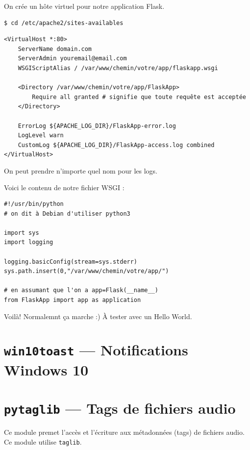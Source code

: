 \documentclass[a4paper, 10pt]{article}
\begin{document}
On crée un hôte virtuel pour notre application Flask.

\begin{verbatim}
$ cd /etc/apache2/sites-availables
\end{verbatim}

\begin{verbatim}
<VirtualHost *:80>
    ServerName domain.com
    ServerAdmin youremail@email.com
    WSGIScriptAlias / /var/www/chemin/votre/app/flaskapp.wsgi

    <Directory /var/www/chemin/votre/app/FlaskApp>
        Require all granted # signifie que toute requête est acceptée
    </Directory>

    ErrorLog ${APACHE_LOG_DIR}/FlaskApp-error.log
    LogLevel warn
    CustomLog ${APACHE_LOG_DIR}/FlaskApp-access.log combined
</VirtualHost>
\end{verbatim}

On peut prendre n'importe quel nom pour les logs.

Voici le contenu de notre fichier WSGI :

\begin{verbatim}
#!/usr/bin/python
# on dit à Debian d'utiliser python3

import sys
import logging

logging.basicConfig(stream=sys.stderr)
sys.path.insert(0,"/var/www/chemin/votre/app/")

# en assumant que l'on a app=Flask(__name__)
from FlaskApp import app as application
\end{verbatim}

Voilà! Normalemnt ça marche :) À tester avec un Hello World.

\section[{\footnotesize\texttt{win10toast}} --- Notifications sous Windows 10]{{\normalfont\large\bfseries\texttt{win10toast}} --- Notifications Windows 10}


\section[{\footnotesize\texttt{pytaglib}} --- Tags de fichiers audio]{{\normalfont\large\bfseries\texttt{pytaglib}} --- Tags de fichiers audio}
Ce module premet l'accès et l'écriture aux métadonnées (tags) de fichiers audio. Ce module utilise \texttt{taglib}.
\end{document}
